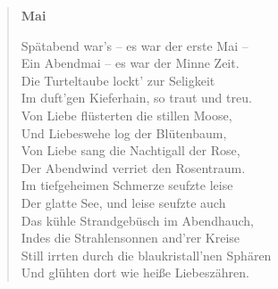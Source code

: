 \begin{verse}
\bigskip

\textbf{Mai}

\smallskip

Spätabend war’s -- es war der erste Mai -- \\
Ein Abendmai -- es war der Minne Zeit. \\
Die Turteltaube lockt’ zur Seligkeit \\
Im duft’gen Kieferhain, so traut und treu. \\
Von Liebe flüsterten die stillen Moose, \\
Und Liebeswehe log der Blütenbaum, \\
Von Liebe sang die Nachtigall der Rose, \\
Der Abendwind verriet den Rosentraum. \\
Im tiefgeheimen Schmerze seufzte leise \\
Der glatte See, und leise seufzte auch \\
Das kühle Strandgebüsch im Abendhauch, \\
Indes die Strahlensonnen and’rer Kreise \\
Still irrten durch die blaukristall’nen Sphären \\
Und glühten dort wie heiße Liebeszähren.

\smallskip


% 
% 
% 
% 
% 


\pagebreak


\end{verse}
